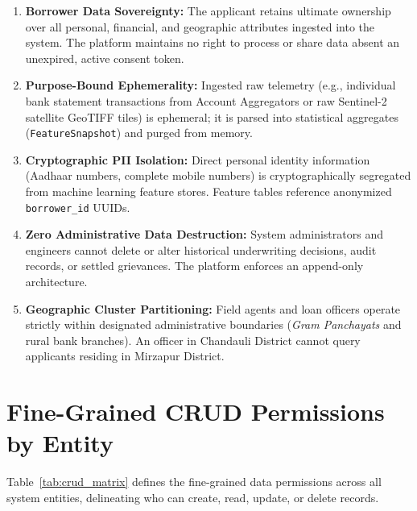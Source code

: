 \documentclass[11pt,a4paper,oneside]{report}
\begin{document}
\begin{enumerate}
  \item \textbf{Borrower Data Sovereignty:} The applicant retains ultimate ownership over all personal, financial, and geographic attributes ingested into the system. The platform maintains no right to process or share data absent an unexpired, active consent token.
  \item \textbf{Purpose-Bound Ephemerality:} Ingested raw telemetry (e.g., individual bank statement transactions from Account Aggregators or raw Sentinel-2 satellite GeoTIFF tiles) is ephemeral; it is parsed into statistical aggregates (\texttt{FeatureSnapshot}) and purged from memory.
  \item \textbf{Cryptographic PII Isolation:} Direct personal identity information (Aadhaar numbers, complete mobile numbers) is cryptographically segregated from machine learning feature stores. Feature tables reference anonymized \texttt{borrower\_id} UUIDs.
  \item \textbf{Zero Administrative Data Destruction:} System administrators and engineers cannot delete or alter historical underwriting decisions, audit records, or settled grievances. The platform enforces an append-only architecture.
  \item \textbf{Geographic Cluster Partitioning:} Field agents and loan officers operate strictly within designated administrative boundaries (\textit{Gram Panchayats} and rural bank branches). An officer in Chandauli District cannot query applicants residing in Mirzapur District.
\end{enumerate}

\section{Fine-Grained CRUD Permissions by Entity}
Table~\ref{tab:crud_matrix} defines the fine-grained data permissions across all system entities, delineating who can create, read, update, or delete records.
\end{document}
